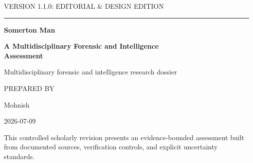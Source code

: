 \begin{titlepage}
\thispagestyle{empty}
\vspace*{0.75in}
{\sffamily\small\MakeUppercase{Version 1.1.0: Editorial \& Design Edition}\par}
\vspace{0.22in}
{\color{AssessmentAccent}\rule{0.38\textwidth}{1.1pt}\par}
\vspace{0.55in}
{\sffamily\bfseries\Huge\color{AssessmentNavy} Somerton Man\par}
\vspace{0.18in}
{\sffamily\bfseries\LARGE\color{AssessmentNavy} A Multidisciplinary Forensic and Intelligence\\Assessment\par}
\vspace{0.45in}
{\large Multidisciplinary forensic and intelligence research dossier\par}
\vfill
{\sffamily\small\MakeUppercase{Prepared by}\par}
\vspace{0.08in}
{\large Mohnish\par}
\vspace{0.15in}
{\large 2026-07-09\par}
\vspace{0.5in}
{\small This controlled scholarly revision presents an evidence-bounded assessment built from documented sources, verification controls, and explicit uncertainty standards.\par}
\end{titlepage}
